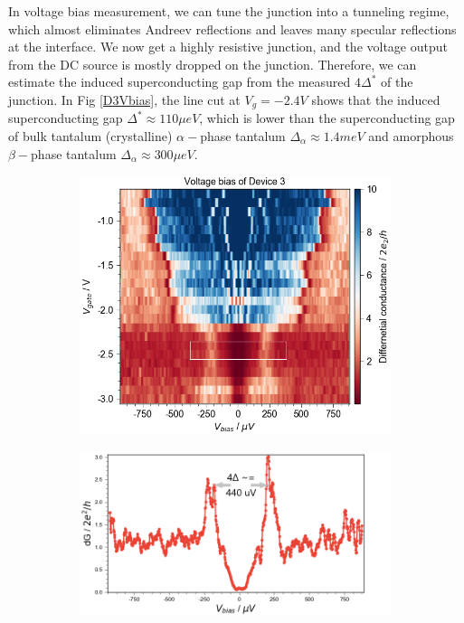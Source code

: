 In voltage bias measurement, we can tune the junction into a tunneling regime, which almost eliminates Andreev reflections and leaves many specular reflections at the interface. We now get a highly resistive junction, and the voltage output from the DC source is mostly dropped on the junction. Therefore, we can estimate the induced superconducting gap from the measured $4\Delta^*$ of the junction. In Fig \ref{D3Vbias}, the line cut at $V_g = -2.4 V$ shows that the induced superconducting gap $\Delta^* \approx 110\mu eV$, which is lower than the superconducting gap of bulk tantalum (crystalline) $\alpha-$phase tantalum $\Delta_\alpha \approx 1.4 meV$ and amorphous $\beta-$phase tantalum $\Delta_\alpha \approx 300 \mu eV$. 
\begin{figure}[h!]
    \centering
    \begin{subfigure}[b]{0.75\textwidth}
            \centering
            \includegraphics[width=\linewidth]{Pic/D3_Vbias.png}
            \caption{}
            \label{fig:my_label}
     \end{subfigure}
     \hfill
     \begin{subfigure}[b]{0.75\textwidth}
            \centering
            \includegraphics[width=\linewidth]{Pic/D3Vbiaslinecut.png} 

\end{subfigure}
\end{figure}

